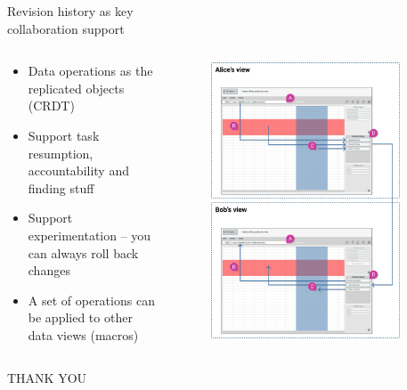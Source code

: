 \documentclass[aspectratio=169]{beamer}
\begin{document}
\begin{frame}{Revision history as key\\ collaboration support}
    \begin{columns}
        \begin{column}{0.5\textwidth}
            \begin{itemize}
                \small
                \item Data operations as the replicated objects (CRDT)
                \item Support task resumption, accountability and finding stuff
                \item Support experimentation -- you can always roll back changes
                \item A set of operations can be applied to other data views (macros)
            \end{itemize}
        \end{column}
        \begin{column}{0.5\textwidth}
            \begin{figure}[h]
                \vspace{-4em}
                \centering
                \includegraphics[width=0.9\textwidth]{images/shared-history.png}
            \end{figure}
        \end{column}
    \end{columns}
\end{frame}

\begin{frame}[DarkSlide]{}
    \vspace{3em}
    \centering
    \Large THANK YOU\\
\end{frame}
\end{document}
